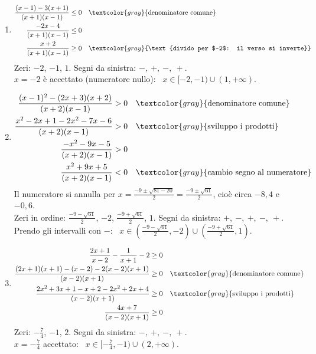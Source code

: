 \begin{question}[ID=2.4, subtitle={Disequazioni frazionarie con più fattori}, difficulty=difficile, tags={disequazioni frazionarie}]
\begin{explanation}
\begin{enumerate}
    Segni del quoziente da sinistra: $-,\ +,\ -,\ +$. Prendo gli intervalli con $+$: \ $x\in(-\tfrac12,-\tfrac17)\cup(2,+\infty)$.
    \item \[\begin{aligned}
    \dfrac{(x-1)-3(x+1)}{(x+1)(x-1)} &\leq 0 && \textcolor{gray}{\text{denominatore comune}}\\
    \dfrac{-2x-4}{(x+1)(x-1)} &\leq 0\\
    \dfrac{x+2}{(x+1)(x-1)} &\geq 0 && \textcolor{gray}{\text{divido per $-2$: il verso si inverte}}
    \end{aligned}\]
    Zeri: $-2$, $-1$, $1$. Segni da sinistra: $-,\ +,\ -,\ +$. \\
    $x=-2$ è accettato (numeratore nullo): \ $x\in[-2,-1)\cup(1,+\infty)$.
    \item \[\begin{aligned}
    \dfrac{(x-1)^2-(2x+3)(x+2)}{(x+2)(x-1)} &> 0 && \textcolor{gray}{\text{denominatore comune}}\\
    \dfrac{x^2-2x+1-2x^2-7x-6}{(x+2)(x-1)} &> 0 && \textcolor{gray}{\text{sviluppo i prodotti}}\\
    \dfrac{-x^2-9x-5}{(x+2)(x-1)} &> 0\\
    \dfrac{x^2+9x+5}{(x+2)(x-1)} &< 0 && \textcolor{gray}{\text{cambio segno al numeratore}}
    \end{aligned}\]
    Il numeratore si annulla per $x=\tfrac{-9\pm\sqrt{81-20}}{2}=\tfrac{-9\pm\sqrt{61}}{2}$, cioè circa $-8{,}4$ e $-0{,}6$. \\
    Zeri in ordine: $\tfrac{-9-\sqrt{61}}{2}$, $-2$, $\tfrac{-9+\sqrt{61}}{2}$, $1$. Segni da sinistra: $+,\ -,\ +,\ -,\ +$. \\
    Prendo gli intervalli con $-$: \ $x\in\left(\tfrac{-9-\sqrt{61}}{2},-2\right)\cup\left(\tfrac{-9+\sqrt{61}}{2},1\right)$.
    \item \[\begin{aligned}
    \dfrac{2x+1}{x-2}-\dfrac{1}{x+1}-2 &\geq 0\\
    \dfrac{(2x+1)(x+1)-(x-2)-2(x-2)(x+1)}{(x-2)(x+1)} &\geq 0 && \textcolor{gray}{\text{denominatore comune}}\\
    \dfrac{2x^2+3x+1-x+2-2x^2+2x+4}{(x-2)(x+1)} &\geq 0 && \textcolor{gray}{\text{sviluppo i prodotti}}\\
    \dfrac{4x+7}{(x-2)(x+1)} &\geq 0
    \end{aligned}\]
    Zeri: $-\tfrac74$, $-1$, $2$. Segni da sinistra: $-,\ +,\ -,\ +$. \\
    $x=-\tfrac74$ accettato: \ $x\in[-\tfrac74,-1)\cup(2,+\infty)$.

\end{enumerate}
\end{explanation}
\end{question}
